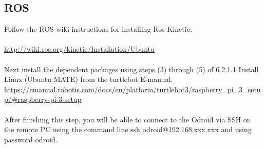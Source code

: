\documentclass[12]{article}
\begin{document}
\subsection{ROS}
Follow the ROS wiki instructions for installing Ros-Kinetic.\\\\
\url{http://wiki.ros.org/kinetic/Installation/Ubuntu}\\\\
Next install the dependent packages using steps (3) through (5) of 6.2.1.1 Install Linux (Ubuntu MATE) from the turtlebot E-manual.\\
\url{https://emanual.robotis.com/docs/en/platform/turtlebot3/raspberry_pi_3_setup/#raspberry-pi-3-setup}\\\\
After finishing this step, you will be able to connect to the Odroid via SSH on the remote PC using the command line ssh odroid@192.168.xxx.xxx and using password odroid. 
\newpage
\end{document}
